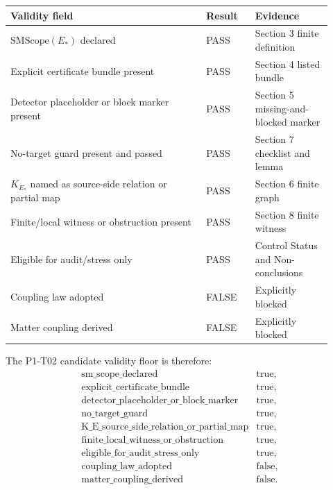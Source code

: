 \documentclass[11pt]{article}
\newcommand{\EStar}{E_{\ast}}
\newcommand{\SMScope}{\mathrm{SMScope}}
\newcommand{\KStar}{K_{E_{\ast}}}
\begin{document}
\begin{center}
\begin{tabular}{>{\raggedright\arraybackslash}p{0.56\linewidth}
                >{\raggedright\arraybackslash}p{0.14\linewidth}
                >{\raggedright\arraybackslash}p{0.22\linewidth}}
\toprule
Validity field & Result & Evidence \\
\midrule
\(\SMScope(\EStar)\) declared & PASS & Section 3 finite definition \\
Explicit certificate bundle present & PASS & Section 4 listed bundle \\
Detector placeholder or block marker present & PASS & Section 5 missing-and-blocked marker \\
No-target guard present and passed & PASS & Section 7 checklist and lemma \\
\(\KStar\) named as source-side relation or partial map & PASS & Section 6 finite graph \\
Finite/local witness or obstruction present & PASS & Section 8 finite witness \\
Eligible for audit/stress only & PASS & Control Status and Non-conclusions \\
Coupling law adopted & FALSE & Explicitly blocked \\
Matter coupling derived & FALSE & Explicitly blocked \\
\bottomrule
\end{tabular}
\end{center}

The P1-T02 candidate validity floor is therefore:
\[
\begin{array}{ll}
\mathrm{sm\_scope\_declared} & \mathrm{true},\\
\mathrm{explicit\_certificate\_bundle} & \mathrm{true},\\
\mathrm{detector\_placeholder\_or\_block\_marker} & \mathrm{true},\\
\mathrm{no\_target\_guard} & \mathrm{true},\\
\mathrm{K\_E\_source\_side\_relation\_or\_partial\_map} & \mathrm{true},\\
\mathrm{finite\_local\_witness\_or\_obstruction} & \mathrm{true},\\
\mathrm{eligible\_for\_audit\_stress\_only} & \mathrm{true},\\
\mathrm{coupling\_law\_adopted} & \mathrm{false},\\
\mathrm{matter\_coupling\_derived} & \mathrm{false}.
\end{array}
\]
\end{document}
